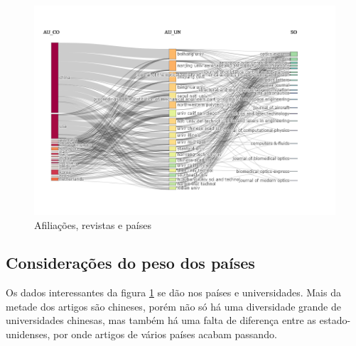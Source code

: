 \begin{figure}[H]
    \centering
    \includegraphics[width=1.1\textwidth]{experiments/KvotheKS/PesqBibliogr/AlgoritmosSimulacaoOptica-Dinamica/WoS-20220202/Dataset/AU_CO_AU_UN_SO.png}
    \caption{Afiliações, revistas e países}
    \label{fig:KvotheKS:SankeyCountry}
\end{figure}
\subsection{Considerações do peso dos países}
    Os dados interessantes da figura \ref{fig:KvotheKS:SankeyCountry} se dão nos países e universidades. Mais da metade dos artigos são chineses, porém não só há uma diversidade grande de universidades chinesas, mas também há uma falta de diferença entre as estado-unidenses, por onde artigos de vários países acabam passando.
\section{}
